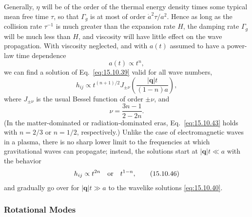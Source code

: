 Generally, \(\eta\) will be of the order of the thermal energy density times
some typical mean free time \(\tau\), so that \(\Gamma_g\) is at most of
order \(\dot a^2\tau/a^2\). Hence as long as the collision rate
\(\tau^{-1}\) is much greater than the expansion rate \(H\), the damping
rate \(\Gamma_g\) will be much less than \(H\), and viscosity will have
little effect on the wave propagation. With viscosity neglected, and with
\(a(t)\) assumed to have a power-law time dependence
\begin{equation}
  a(t)\propto t^n,
  \tag{15.10.43}\label{eq:15.10.43}
\end{equation}
we can find a solution of Eq.~\eqref{eq:15.10.39} valid for all wave
numbers,
\begin{equation}
  h_{ij}
  \propto
  t^{(n+1)/2}
  J_{\pm\nu}
  \left(
    \frac{\lvert\mathbf q\rvert t}{(1-n)a}
  \right),
  \tag{15.10.44}\label{eq:15.10.44}
\end{equation}
where \(J_{\pm\nu}\) is the usual Bessel function of order \(\pm\nu\), and
\begin{equation}
  \nu=\frac{3n-1}{2-2n}.
  \tag{15.10.45}\label{eq:15.10.45}
\end{equation}
(In the matter-dominated or radiation-dominated eras,
Eq.~\eqref{eq:15.10.43} holds with \(n=2/3\) or \(n=1/2\), respectively.)
Unlike the case of electromagnetic waves in a plasma, there is no sharp lower
limit to the frequencies at which gravitational waves can propagate; instead,
the solutions start at \(\lvert\mathbf q\rvert t\ll a\) with the behavior
\begin{equation}
  h_{ij}\propto t^{2n}
  \quad\hbox{or}\quad
  t^{1-n},
  \tag{15.10.46}\label{eq:15.10.46}
\end{equation}
and gradually go over for \(\lvert\mathbf q\rvert t\gg a\) to the wavelike
solutions \eqref{eq:15.10.40}.

\subsubsection*{Rotational Modes}

